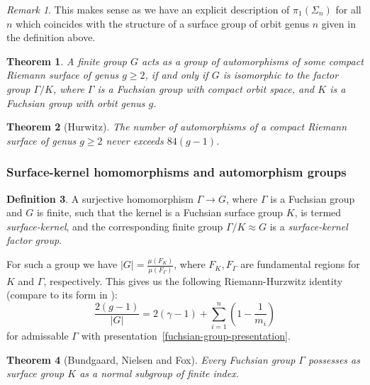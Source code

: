 \documentclass[reqno]{amsart}
\newtheorem{theorem}{Theorem}[section]
\theoremstyle{definition}
\newtheorem{definition}[theorem]{Definition}
\theoremstyle{remark}
\newtheorem*{remark}{Remark}
\begin{document}
\begin{remark}
    This makes sense
    as we have an explicit
    description of
    $\pi_1(\Sigma_n)$ for
    all $n$ which coincides
    with the structure of a surface group of
    orbit genus $n$ given
    in the definition above.
\end{remark}

\begin{theorem}
    A finite group $G$ acts
    as a group of automorphisms
    of some compact Riemann surface
    of genus $g \geq 2$, if
    and only if $G$ is isomorphic to the \textit{factor group}
    $\Gamma /K$, where
    $\Gamma$ is a Fuchsian group with compact orbit space, and $K$ is a Fuchsian group with orbit genus $g$.
\end{theorem}

\begin{theorem}[Hurwitz]
    The number of automorphisms of a compact Riemann surface of genus $g \geq 2$ never exceeds
    $84 (g-1)$.
\end{theorem}



\subsubsection{Surface-kernel homomorphisms and automorphism
groups}

\begin{definition}
    A surjective homomorphism 
    $\Gamma \to G$, where
    $\Gamma$ is a Fuchsian group and $G$ is finite, such that the kernel is a Fuchsian surface group $K$,
    is termed \textit{surface-kernel}, and the corresponding finite group
    $\Gamma / K \approx G$ is
    a \textit{surface-kernel factor group}.
\end{definition}

For such a group we have
$\left| G \right| =
\frac{\mu (F_K)}{\mu(F_{\Gamma})}$,
where $F_K, F_{\Gamma}$ are
fundamental regions for
$K$ and $\Gamma$, respectively.
This gives us
the following Riemann-Hurzwitz
identity (compare to its form
in \cite[Lemma~2.39]{Girondo-Gonzalez-Diez}):
\[
\frac{2(g-1)}{\left|G\right|}
= 2 (\gamma -1) + 
\sum_{i=1}^n \left(1-
\frac{1}{m_i} \right) \tag{$\zeta$}\label{Riemann-Hurwitz-Harvey}
\]
for admissable $\Gamma$ with presentation~\ref{fuchsian-group-presentation}.


\begin{theorem}[Bundgaard, Nielsen and Fox]
    Every Fuchsian group $\Gamma$ possesses as surface group $K$ as a normal subgroup of finite index.
\end{theorem}
\end{document}
